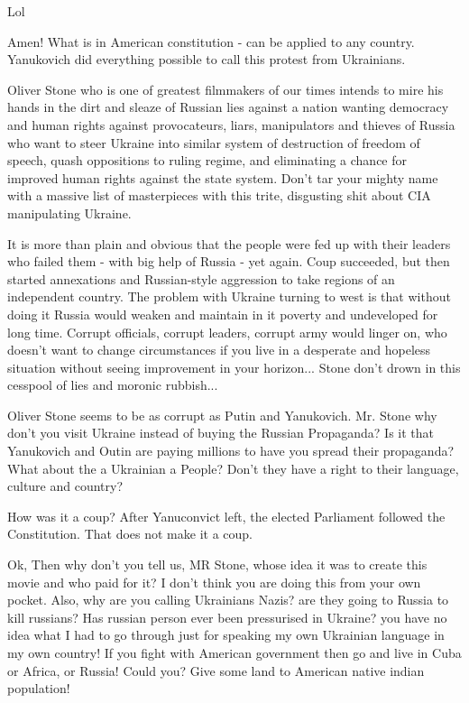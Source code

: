 \begin{itemize}
\begin{itemize}
Lol


Amen! What is in American constitution - can be applied to any country.
Yanukovich did everything possible to call this protest from Ukrainians.


Oliver Stone who is one of greatest filmmakers of our times intends to mire his
hands in the dirt and sleaze of Russian lies against a nation wanting democracy
and human rights against provocateurs, liars, manipulators and thieves of
Russia who want to steer Ukraine into similar system of destruction of freedom
of speech, quash oppositions to ruling regime, and eliminating a chance for
improved human rights against the state system. Don't tar your mighty name with
a massive list of masterpieces with this trite, disgusting shit about CIA
manipulating Ukraine.

It is more than plain and obvious that the people were fed up with their
leaders who failed them - with big help of Russia - yet again. Coup succeeded,
but then started annexations and Russian-style aggression to take regions of an
independent country. The problem with Ukraine turning to west is that without
doing it Russia would weaken and maintain in it poverty and undeveloped for
long time. Corrupt officials, corrupt leaders, corrupt army would linger on,
who doesn't want to change circumstances if you live in a desperate and
hopeless situation without seeing improvement in your horizon... Stone don't
drown in this cesspool of lies and moronic rubbish...


Oliver Stone seems to be as corrupt as Putin and Yanukovich. Mr. Stone why
don't you visit Ukraine instead of buying the Russian Propaganda? Is it that
Yanukovich and Outin are paying millions to have you spread their propaganda?
What about the a Ukrainian a People? Don't they have a right to their language,
culture and country?



How was it a coup? After Yanuconvict left, the elected Parliament followed the
Constitution. That does not make it a coup.

\end{itemize} %


Ok, Then why don't you tell us, MR Stone, whose idea it was to create this
movie and who paid for it? I don't think you are doing this from your own
pocket. Also, why are you calling Ukrainians Nazis? are they going to Russia to
kill russians? Has russian person ever been pressurised in Ukraine? you have no
idea what I had to go through just for speaking my own Ukrainian language in my
own country! If you fight with American government then go and live in Cuba or
Africa, or Russia! Could you? Give some land to American native indian
population!


\end{itemize}
